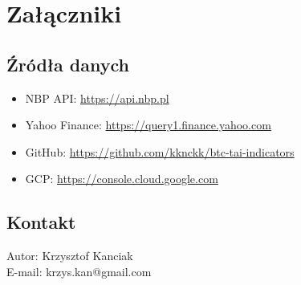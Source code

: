 \newpage
\appendix
\section{Załączniki}

\subsection{Źródła danych}
\begin{itemize}
\item NBP API: \url{https://api.nbp.pl}
\item Yahoo Finance: \url{https://query1.finance.yahoo.com}
\item GitHub: \url{https://github.com/kknckk/btc-tai-indicators}
\item GCP: \url{https://console.cloud.google.com}
\end{itemize}

\subsection{Kontakt}
Autor: Krzysztof Kanciak\\
E-mail: krzys.kan@gmail.com


